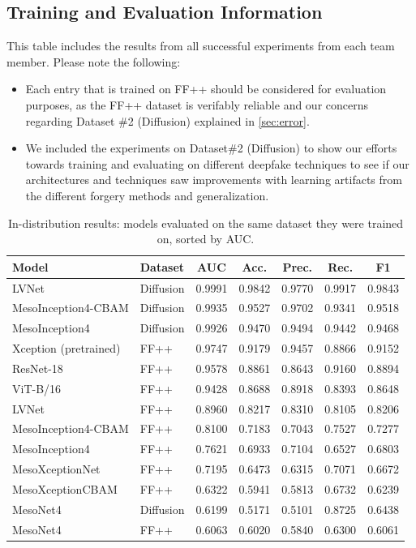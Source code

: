 \documentclass[conference]{IEEEtran}
\begin{document}
\subsection{Training and Evaluation Information}
This table includes the results from all successful experiments from each team member. Please note the following:
\begin{itemize}
\item Each entry that is trained on FF++ should be considered for evaluation purposes, as the FF++ dataset is verifably reliable and our concerns regarding Dataset \#2 (Diffusion) explained in \autoref{sec:error}.
\item We included the experiments on Dataset\#2 (Diffusion) to show our efforts towards training and evaluating on different deepfake techniques to see if our architectures and techniques saw improvements with learning artifacts from the different forgery methods and generalization.
\end{itemize}

\begin{table}[t]
\centering
\caption{In-distribution results: models evaluated on the same dataset they were trained on, sorted by AUC.}
\label{tab:ablation_indist}
\begin{tabular}{llccccc}
\toprule
\textbf{Model} & \textbf{Dataset} & \textbf{AUC} & \textbf{Acc.} & \textbf{Prec.} & \textbf{Rec.} & \textbf{F1} \\
\midrule
LVNet                  & Diffusion & 0.9991 & 0.9842 & 0.9770 & 0.9917 & 0.9843 \\
MesoInception4-CBAM    & Diffusion & 0.9935 & 0.9527 & 0.9702 & 0.9341 & 0.9518 \\
MesoInception4         & Diffusion & 0.9926 & 0.9470 & 0.9494 & 0.9442 & 0.9468 \\
Xception (pretrained)  & FF++      & 0.9747 & 0.9179 & 0.9457 & 0.8866 & 0.9152 \\
ResNet-18              & FF++      & 0.9578 & 0.8861 & 0.8643 & 0.9160 & 0.8894 \\
ViT-B/16               & FF++      & 0.9428 & 0.8688 & 0.8918 & 0.8393 & 0.8648 \\
LVNet                  & FF++      & 0.8960 & 0.8217 & 0.8310 & 0.8105 & 0.8206 \\
MesoInception4-CBAM    & FF++      & 0.8100 & 0.7183 & 0.7043 & 0.7527 & 0.7277 \\
MesoInception4         & FF++      & 0.7621 & 0.6933 & 0.7104 & 0.6527 & 0.6803 \\
MesoXceptionNet        & FF++      & 0.7195 & 0.6473 & 0.6315 & 0.7071 & 0.6672 \\
MesoXceptionCBAM       & FF++      & 0.6322 & 0.5941 & 0.5813 & 0.6732 & 0.6239 \\
MesoNet4               & Diffusion & 0.6199 & 0.5171 & 0.5101 & 0.8725 & 0.6438 \\
MesoNet4               & FF++      & 0.6063 & 0.6020 & 0.5840 & 0.6300 & 0.6061 \\
\bottomrule
\end{tabular}
\end{table}
\end{document}
